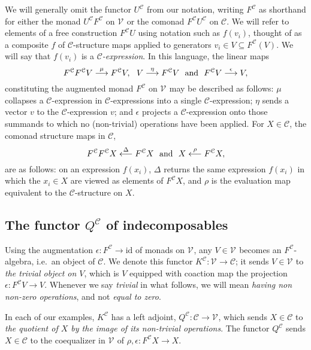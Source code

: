 \documentclass[11pt]{amsart} \renewcommand{\baselinestretch}{1.4}
\theoremstyle{plain}
\theoremstyle{definition}
\renewcommand{\to}{\longrightarrow}
\newcommand{\from}{\longleftarrow}
\newcommand{\calV}{\mathcal{V}}
\newcommand{\calc}{\mathcal{C}}
\newcommand{\vect}[2]{\calV^{#1}_{#2}}
\newcommand{\Id}{\mathrm{id}}
\begin{document}
\begin{Conventions and notation}
We will generally omit the functor $U^{\calc}$ from our notation, writing $F^{\calc}$ as shorthand for either the monad $U^{\calc}F^{\calc}$ on $\vect{}{}$ or the comonad $F^{\calc}U^{\calc}$ on $\calc$. We will refer to elements of a free construction $F^\calc U$ using notation such as $f(v_i)$, thought of as a composite $f$ of $\calc$-structure maps applied to generators $v_i\in V\subseteq F^\calc(V)$. We will say that $f(v_i)$ is a \emph{$\calc$-expression}. In this language, the linear maps %
\[F^\calc F^\calc V\overset{\mu}{\to} F^\calc V,\ \ V\overset{\eta}{\to}F^\calc V\ \ \textup{and}\ \ F^\calc V\overset{\epsilon}{\to}V, \]
constituting the augmented monad $F^\calc $ on $\vect{}{}$ may be described as follows: $\mu$ collapses a $\calc$-expression  in $\calc$-expressions into a single $\calc$-expression; $\eta$ sends a vector $v$ to the $\calc$-expression $v$; and $\epsilon$ projects a $\calc$-expression onto those summands to which no (non-trivial) operations have been applied.
For $X\in \calc$, the comonad structure maps in $\calc$,
\[F^\calc F^\calc X\overset{\Delta}{\from} F^\calc X\ \ \textup{and}\ \ X\overset{\rho}{\from}F^\calc X,\]
are as follows: on an expression $f(x_i)$, $\Delta$ returns the same expression $f(x_i)$ in which the $x_i\in X$ are viewed as elements of $F^\calc X$, and $\rho$ is the evaluation map equivalent to the $\calc$-structure on $X$.

\subsection{The functor $Q^\calc$ of indecomposables}
Using the augmentation $\epsilon:F^\calc\to\Id$ of monads on $\vect{}{}$, any $V\in\vect{}{}$ becomes an $F^\calc $-algebra, i.e.\ an object of $\calc$. We denote this functor $K^\calc:\vect{}{}\to \calc$; it sends $V\in\vect{}{}$ to \emph{the trivial object on $V$}, which is $V$ equipped with coaction map the projection $\epsilon:F^{\calc}V\to V$. Whenever we say \emph{trivial} in what follows, we will mean \emph{having non non-zero operations}, and not \emph{equal to zero}.

In each of our examples,  $K^{\calc}$ has a left adjoint, $Q^{\calc}:\calc\to\vect{}{}$, which sends $X\in\calc$ to \emph{the quotient of $X$ by the image of its non-trivial operations}. %
The functor $Q^{\calc}$ sends $X\in \calc$ to the coequalizer in $\vect{}{}$ of $\rho,\epsilon:F^\calc X\to X$.


\end{Conventions and notation}
\end{document}
